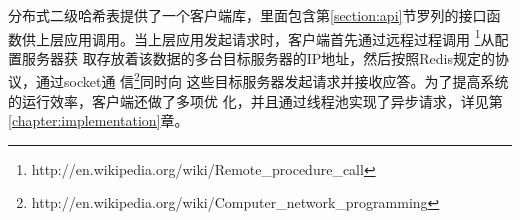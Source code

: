 分布式二级哈希表提供了一个客户端库，里面包含第\ref{section:api}节罗列的接口函
数供上层应用调用。当上层应用发起请求时，客户端首先通过远程过程调用
\footnote{http://en.wikipedia.org/wiki/Remote\_procedure\_call}从配置服务器获
取存放着该数据的多台目标服务器的IP地址，然后按照Redis规定的协议，通过socket通
信\footnote{http://en.wikipedia.org/wiki/Computer\_network\_programming}同时向
这些目标服务器发起请求并接收应答。为了提高系统的运行效率，客户端还做了多项优
化，并且通过线程池实现了异步请求，详见第\ref{chapter:implementation}章。
